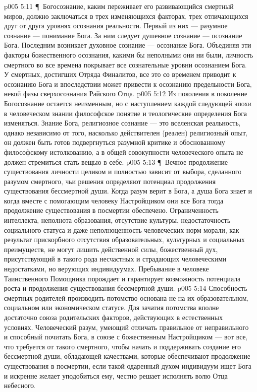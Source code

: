 \vs p005 5:11 \P\ Богосознание, каким переживает его развивающийся смертный миров, должно заключаться в трех изменяющихся факторах, трех отличающихся друг от друга уровнях осознания реальности. Первый из них --- разумное сознание --- понимание  Бога. За ним следует душевное сознание --- осознание  Бога. Последним возникает духовное сознание --- осознание  Бога. Объединяя эти факторы божественного осознания, какими бы неполными они ни были, личность смертного во все времена покрывает все сознательные уровни осознанием  Бога. У смертных, достигших Отряда Финалитов, все это со временем приводит к осознанию  Бога и впоследствии может привести к осознанию предельности Бога, некой фазы  сверхосознания Райского Отца.
\vs p005 5:12 Из поколения в поколение Богосознание остается неизменным, но с наступлением каждой следующей эпохи в человеческом знании философское понятие и теологические определения Бога  изменяться. Знание Бога, религиозное сознание --- это вселенская реальность, однако независимо от того, насколько действителен (реален) религиозный опыт, он должен быть готов подвергнуться разумной критике и обоснованному философскому истолкованию, а в общей совокупности человеческого опыта не должен стремиться стать вещью в себе.
\vs p005 5:13 \P\ Вечное продолжение существования личности целиком и полностью зависит от выбора, сделанного разумом смертного, чьи решения определяют потенциал продолжения существования бессмертной души. Когда разум верит в Бога, а душа Бога знает и когда вместе с помогающим человеку Настройщиком они все Бога  тогда продолжение существования в посмертии обеспечено. Ограниченность интеллекта, неполнота образования, отсутствие культуры, недостаточность социального статуса и даже неполноценность человеческих норм морали, как результат прискорбного отсутствия образовательных, культурных и социальных преимуществ, не могут лишить действенной силы, божественный дух, присутствующий в такого рода несчастных и страдающих человеческими недостатками, но верующих индивидуумах. Пребывание в человеке Таинственного Помощника порождает и гарантирует возможность потенциала роста и продолжения существования бессмертной души.
\vs p005 5:14 Способность смертных родителей производить потомство основана не на их образовательном, социальном или экономическом статусе. Для зачатия потомства вполне достаточно союза родительских факторов, действующих в естественных условиях. Человеческий разум, умеющий отличать правильное от неправильного и способный почитать Бога, в союзе с божественным Настройщиком --- вот все, что требуется от такого смертного, чтобы начать и поддерживать создание его бессмертной души, обладающей качествами, которые обеспечивают продолжение существования в посмертии, если такой одаренный духом индивидуум ищет Бога и искренне желает уподобиться ему, честно решает исполнять волю Отца небесного.
